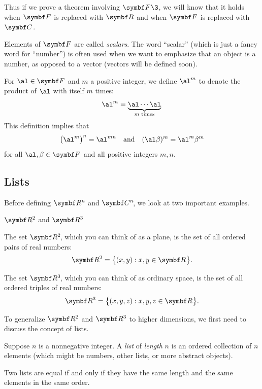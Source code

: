 

Thus if we prove a theorem involving $\F{}\3$, we will know that it
holds when $\F{}$ is replaced with $\R{}$ and when $\F{}$ is replaced with $\C{}$.

Elements of $\F{}$ are called \emph{scalars}.  The word
``scalar'' (which is just a fancy word for ``number'') is often used when we want to emphasize that
an object is a number, as opposed to a vector (vectors will be defined soon).

For $\al \in \F{}$ and $m$ a positive integer, we define $\al^m$ to denote the
product of $\al$ with itself $m$ times:
\[
\al^m = \underbrace{\al \cdots \al}_{m \text{ times}}\!\!.
\]
This definition implies that
\[
\paren[\big]{\al^m}^n = \al^{mn} \andd (\al \beta)^m = \al^m \beta^m
\]
for all $\al, \beta \in \F{}$ and all positive integers $m, n$.

\pagebreak[3]

\subsection{Lists}

Before defining $\R{n}$ and $\CC{n}$, we look at two important examples.

\begin{example}{$\R{2}$ and\/ $\R{3}$}
\begin{Itemize}
\item
The set $\RR{2}$, which you can think of as a plane, is the set of all ordered pairs of real numbers:
\[
\R{2} = \br[\big]{(x,y): x, y \in \R{} }.
\]
\item
The set $\RR{3}$, which you can think of as ordinary space,
is the set of all ordered triples of real numbers:
\[
\R{3} = \br[\big]{(x,y, z): x, y, z \in \R{} }.
\]
\end{Itemize}
\vspace{-.12in}
\end{example}

To generalize $\R{2}$ and $\R{3}$ to higher dimensions, we first need
to discuss the concept of lists.

{\begin{Itemize}
\item
Suppose $n$ is a nonnegative integer.  A \emph{list} of \emph{length} $n$ is an ordered collection of $n$ elements (which might be numbers, other lists, or more abstract objects).
\item
Two lists are equal if and only if they have the same length and the same elements in the same order.
\end{Itemize}}

